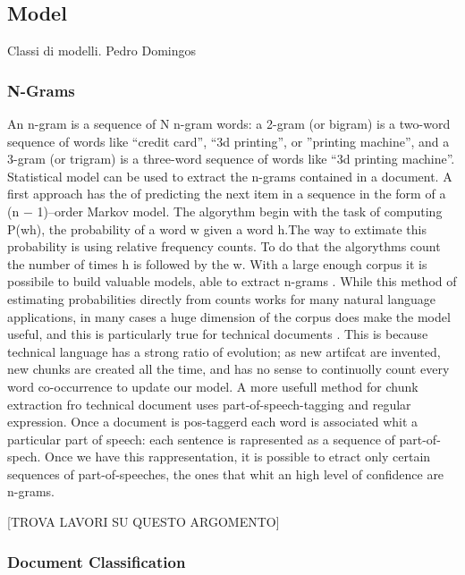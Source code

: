 \documentclass[]{book}
\begin{document}
\subsection{Model}\label{sotatoolsmodel}

Classi di modelli. Pedro Domingos

\subsubsection{N-Grams}\label{sotatoolstransformngrams}

An n-gram is a sequence of N n-gram words: a 2-gram (or bigram) is a
two-word sequence of words like ``credit card'', ``3d printing'', or
''printing machine'', and a 3-gram (or trigram) is a three-word sequence
of words like ``3d printing machine''. Statistical model can be used to
extract the n-grams contained in a document. A first approach has the of
predicting the next item in a sequence in the form of a (n − 1)--order
Markov model\citep{lafferty2001document}. The algorythm begin with the
task of computing P(w\textbar{}h), the probability of a word w given a
word h.The way to extimate this probability is using relative frequency
counts. To do that the algorythms count the number of times h is
followed by the w. With a large enough corpus it is possibile to build
valuable models, able to extract n-grams
\citep{bellegarda2004statistical}. While this method of estimating
probabilities directly from counts works for many natural language
applications, in many cases a huge dimension of the corpus does make the
model useful, and this is particularly true for technical documents
\citep{brants2012large}. This is because technical language has a strong
ratio of evolution; as new artifcat are invented, new chunks are created
all the time, and has no sense to continuolly count every word
co-occurrence to update our model\citep{gibson1994tools}. A more usefull
method for chunk extraction fro technical document uses
part-of-speech-tagging and regular expression. Once a document is
pos-taggerd each word is associated whit a particular part of speech:
each sentence is rapresented as a sequence of part-of-spech. Once we
have this rappresentation, it is possible to etract only certain
sequences of part-of-speeches, the ones that whit an high level of
confidence are n-grams.

{[}TROVA LAVORI SU QUESTO ARGOMENTO{]}

\subsubsection{Document Classification}\label{sotatoolsmodeldocclass}
\end{document}
